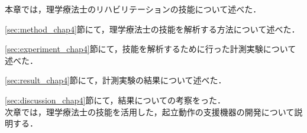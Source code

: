 本章では，理学療法士のリハビリテーションの技能について述べた．

\ref{sec:method_chap4}節にて，理学療法士の技能を解析する方法について述べた．

\ref{sec:experiment_chap4}節にて，技能を解析するために行った計測実験について述べた．

\ref{sec:result_chap4}節にて，計測実験の結果について述べた．

\ref{sec:discussion_chap4}節にて，結果についての考察をった．\\

次章では，理学療法士の技能を活用した，起立動作の支援機器の開発について説明する．


\clearpage

